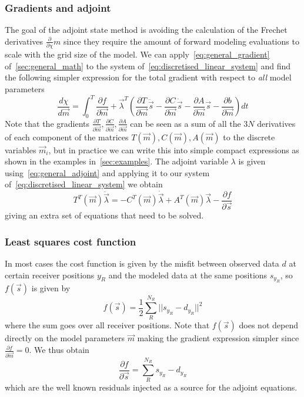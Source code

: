 \documentclass[10pt]{SelfArx} %
\newcommand{\pder}[2][]{\frac{\partial#1}{\partial#2}}
\theoremstyle{definition}
\begin{document}
\subsubsection{Gradients and adjoint}
The goal of the adjoint state method is avoiding the calculation of the Frechet derivatives $\pder{\chi}{m}$ since they require the amount of forward modeling evaluations to scale with the grid size of the model. We can apply~\cref{eq:general_gradient} of~\cref{sec:general_math} to the system of~\cref{eq:discretised_linear_system} and find the following simpler expression for the total gradient with respect to \emph{all} model parameters
\begin{equation}\label{eq:gradient_discretised_linear}
\frac{d\chi}{d\vec{m}} = \int_0^T \pder[f]{\vec{m}} + \vec{\lambda}^T \left(\pder[T]{\vec{m}}\ddot{\vec{s}} - \pder[C]{\vec{m}}\dot{\vec{s}} - \pder[A]{\vec{m}}\vec{s} -\pder[b]{\vec{m}}\right) dt
\end{equation}
Note that the gradients $\pder[T]{\vec{m}}, \pder[C]{\vec{m}}, \pder[A]{\vec{m}}$ can be seen as a sum of all the $3N$ derivatives of each component of the matrices $T\left(\vec{m}\right), C\left(\vec{m}\right), A\left(\vec{m}\right)$ to the discrete variables $\vec{m}_i$, but in practice we can write this into simple compact expressions as shown in the examples in~\cref{sec:examples}.
The adjoint variable $\lambda$ is given using~\cref{eq:general_adjoint} and applying it to our system of~\cref{eq:discretised_linear_system} we obtain
\begin{equation}\label{eq:adjoint_discretised_linear}
T^T\left(\vec{m}\right) \ddot{\vec{\lambda}} = -C^T\left(\vec{m}\right)\dot{\vec{\lambda}} + A^T\left(\vec{m}\right) \vec{\lambda} - \pder[f]{\vec{s}}
\end{equation}
giving an extra set of equations that need to be solved. 


\subsubsection{Least squares cost function}
In most cases the cost function is given by the misfit between observed data $d$ at certain receiver positions $y_R$ and the modeled data at the same positions $s_{y_R}$, so $f\left(\vec{s}\right)$ is given by 
\begin{equation}\label{eq:cost_function_standard}
f\left(\vec{s}\right) =\frac{1}{2} \sum_{R}^{N_R}||s_{y_R} - d_{y_R}||^2
\end{equation}
where the sum goes over all receiver positions. Note that $f\left(\vec{s}\right)$ does not depend directly on the model parameters $\vec{m}$ making the gradient expression simpler since $\pder[f]{\vec{m}} = 0$. We thus obtain
\begin{equation}\label{eq:adjoint_source}
\pder[f]{\vec{s}} =  \sum_{R}^{N_R}s_{y_R} - d_{y_R} 
\end{equation}
which are the well known residuals injected as a source for the adjoint equations. 
\end{document}
